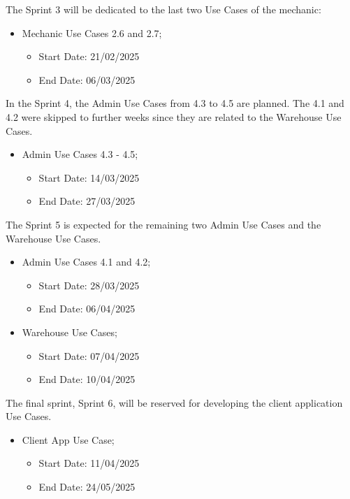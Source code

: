 The Sprint 3 will be dedicated to the last two Use Cases of the mechanic:  

  \begin{itemize}
    \item Mechanic Use Cases 2.6 and 2.7;
    \begin{itemize}
      \item Start Date: 21/02/2025 
      \item End Date: 06/03/2025 
  \end{itemize}
\end{itemize}

In the Sprint 4, the Admin Use Cases from 4.3 to 4.5 are planned. The 4.1 and 4.2 were skipped to further weeks since they are related to the Warehouse Use Cases.

    \begin{itemize}
      \item Admin Use Cases 4.3 - 4.5;
    \begin{itemize}
      \item Start Date: 14/03/2025 
      \item End Date: 27/03/2025 
  \end{itemize}
\end{itemize}

The Sprint 5 is expected for the remaining two Admin Use Cases and the Warehouse Use Cases.

\begin{itemize}
  \item Admin Use Cases 4.1 and 4.2;
  \begin{itemize}
    \item Start Date: 28/03/2025 
    \item End Date: 06/04/2025 
  \end{itemize}
  \item Warehouse Use Cases;
  \begin{itemize}
    \item Start Date: 07/04/2025 
    \item End Date: 10/04/2025 
  \end{itemize}
\end{itemize}

The final sprint, Sprint 6, will be reserved for developing the client application Use Cases.

\begin{itemize}
  \item Client App Use Case;
  \begin{itemize}
    \item Start Date: 11/04/2025  
    \item End Date: 24/05/2025 
  \end{itemize} 
\end{itemize}

